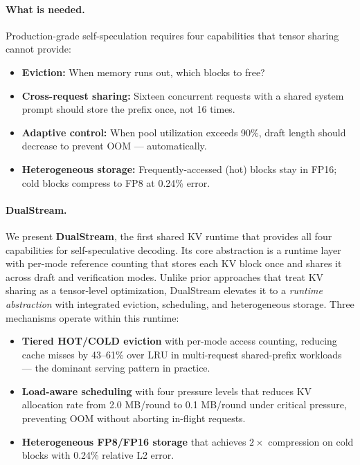 \documentclass[review]{elsarticle}
\theoremstyle{definition}
\theoremstyle{remark}
\begin{document}
\paragraph{What is needed.}
Production-grade self-speculation requires four capabilities that tensor
sharing cannot provide:
\begin{itemize}
    \item \textbf{Eviction:} When memory runs out, which blocks to free?
    \item \textbf{Cross-request sharing:} Sixteen concurrent requests with
    a shared system prompt should store the prefix once, not 16 times.
    \item \textbf{Adaptive control:} When pool utilization exceeds 90\%,
    draft length should decrease to prevent OOM --- automatically.
    \item \textbf{Heterogeneous storage:} Frequently-accessed (hot) blocks
    stay in FP16; cold blocks compress to FP8 at 0.24\% error.
\end{itemize}

\paragraph{DualStream.}
We present \textbf{DualStream}, the first shared KV runtime that provides
all four capabilities for self-speculative decoding. Its core abstraction
is a runtime layer with per-mode reference counting that stores each KV
block once and shares it across draft and verification modes. Unlike
prior approaches that treat KV sharing as a tensor-level optimization,
DualStream elevates it to a \emph{runtime abstraction} with integrated
eviction, scheduling, and heterogeneous storage. Three mechanisms operate
within this runtime:
\begin{itemize}
    \item \textbf{Tiered HOT/COLD eviction} with per-mode access counting,
    reducing cache misses by 43--61\% over LRU in multi-request
    shared-prefix workloads --- the dominant serving pattern in practice.
    \item \textbf{Load-aware scheduling} with four pressure levels that
    reduces KV allocation rate from 2.0 MB/round to 0.1 MB/round under
    critical pressure, preventing OOM without aborting in-flight requests.
    \item \textbf{Heterogeneous FP8/FP16 storage} that achieves $2\times$
    compression on cold blocks with 0.24\% relative L2 error.
\end{itemize}
\end{document}
